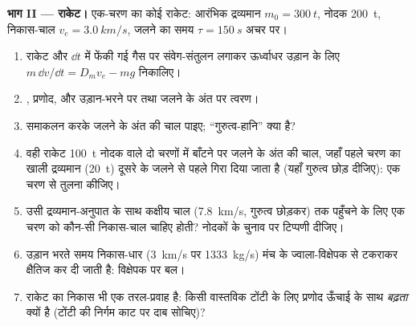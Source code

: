 \begin{problem}
\medskip
\noindent\textbf{भाग II --- राकेट।}
एक-चरण का कोई राकेट: आरंभिक द्रव्यमान $m_0 = \qty{300}{t}$, नोदक
\qty{200}{t}, निकास-चाल $v_e = \qty{3.0}{km/s}$, जलने का समय $\tau =
\qty{150}{s}$ अचर  पर।
\begin{enumerate}[resume]
  \item राकेट और $\dd t$ में फेंकी गई गैस पर संवेग-संतुलन लगाकर
        ऊर्ध्वाधर उड़ान के लिए $m\,\dd v/\dd t = D_mv_e - mg$
        निकालिए।
  \item {}, प्रणोद, और उड़ान-भरने पर तथा
        जलने के अंत पर त्वरण।
  \item समाकलन करके जलने के अंत की चाल पाइए; ``गुरुत्व-हानि''
        क्या है?
  \item वही राकेट \qty{100}{t} नोदक वाले दो चरणों में बाँटने पर जलने के
        अंत की चाल, जहाँ पहले चरण का खाली द्रव्यमान
        (\qty{20}{t}) दूसरे के जलने से पहले गिरा दिया जाता है (यहाँ
        गुरुत्व छोड़ दीजिए): एक चरण से तुलना कीजिए।
  \item उसी द्रव्यमान-अनुपात के साथ कक्षीय चाल
        (\qty{7.8}{km/s}, गुरुत्व छोड़कर) तक पहुँचने के लिए एक चरण को
        कौन-सी निकास-चाल चाहिए होती? नोदकों के चुनाव पर टिप्पणी दीजिए।
  \item उड़ान भरते समय निकास-धार (\qty{3}{km/s} पर \qty{1333}{kg/s}) मंच के
        ज्वाला-विक्षेपक से टकराकर क्षैतिज कर दी जाती है:
        विक्षेपक पर बल।
  \item राकेट का निकास भी एक तरल-प्रवाह है: किसी वास्तविक टोंटी के लिए
        प्रणोद ऊँचाई के साथ \emph{बढ़ता} क्यों है (टोंटी की निर्गम काट पर
        दाब सोचिए)?
\end{enumerate}


\end{problem}
